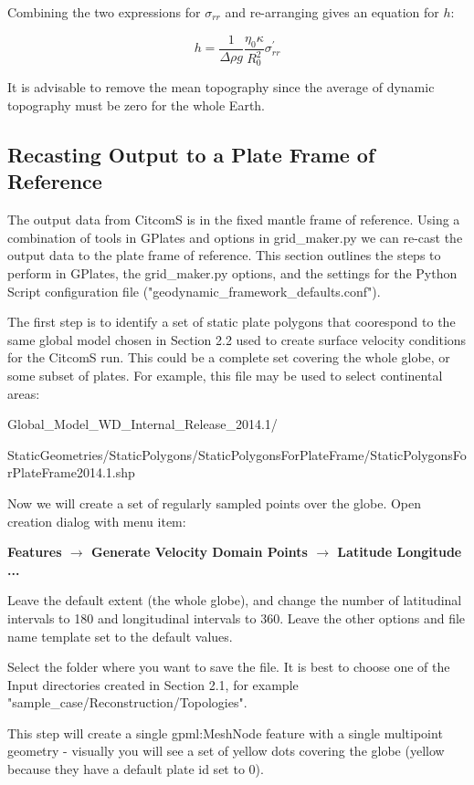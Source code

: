 \documentclass[letterpaper,12pt]{article}
\newcommand{\gp}[1]{\textbf{#1}}
\newcommand{\gplatesmodel}{Global\_Model\_WD\_Internal\_Release\_2014.1/ }
\newcommand{\caserecondir}{Reconstruction}
\begin{document}
Combining the two expressions for $\sigma_{rr}$ and re-arranging gives an equation for $h$:

\begin{equation}
h = \frac{1}{\Delta \rho g} \frac{\eta_0 \kappa}{R_0^2} \sigma_{rr}^\prime
\end{equation}

It is advisable to remove the mean topography since the average of dynamic topography must be zero for the whole Earth.

\subsection{Recasting Output to a Plate Frame of Reference}

The output data from CitcomS is in the fixed mantle frame of reference.  
Using a combination of tools in GPlates and options in grid\_maker.py we can re-cast the output data to the plate frame of reference.
This section outlines the steps to perform in GPlates, the grid\_maker.py options, and the settings for the Python Script 
configuration file ("geodynamic\_framework\_defaults.conf").

The first step is to identify a set of static plate polygons that coorespond 
to the same global model chosen in Section 2.2 used to create surface velocity conditions for the CitcomS run.  
This could be a complete set covering the whole globe, or some subset of plates.  
For example, this file may be used to select continental areas:

\gplatesmodel 

StaticGeometries/StaticPolygons/StaticPolygonsForPlateFrame/StaticPolygonsForPlateFrame2014.1.shp

Now we will create a set of regularly sampled points over the globe.  Open creation dialog with menu item: 

\gp{Features $\rightarrow$ Generate Velocity Domain Points $\rightarrow$ Latitude Longitude ...}

Leave the default extent (the whole globe), and change the number of 
latitudinal intervals to 180 and longitudinal intervals to 360. 
Leave the other options and file name template set to the default values.

Select the folder where you want to save the file.  
It is best to choose one of the Input directories created in Section 2.1, 
for example "sample\_case/\caserecondir/Topologies".  

This step will create a single gpml:MeshNode feature with a single multipoint geometry - 
visually you will see a set of yellow dots covering the globe (yellow because they have a default plate id set to 0).
\end{document}
